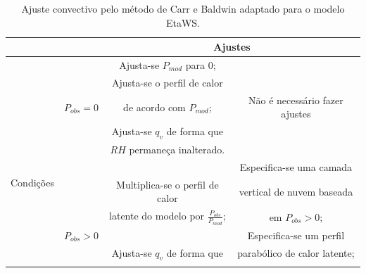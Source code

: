 \begin{table}[!hbp]
\caption{Ajuste convectivo pelo método de Carr e Baldwin adaptado para o \-mo\-de\-lo EtaWS.}
\label{tab02}
\centering
\begin{tabular}{|c|c|c|c|}
\cline{3-4} 
\multicolumn{1}{c}{} &  & \multicolumn{2}{c|}{Ajustes}\tabularnewline
\hline 
\begin{sideways}

\end{sideways} &  & Ajusta-se $P_{mod}$ para 0; & \tabularnewline
\begin{sideways}

\end{sideways} &  & Ajusta-se o perfil de calor & \tabularnewline
\begin{sideways}

\end{sideways} & $P_{obs}=0$ & de acordo com $P_{mod}$; & Não é necessário fazer ajustes\tabularnewline
\begin{sideways}

\end{sideways} &  & Ajusta-se $q_{v}$ de forma que & \tabularnewline
\begin{sideways}

\end{sideways} &  & $RH$ permaneça inalterado. & \tabularnewline
\cline{2-4} 
\multirow{2}{0pt}{\begin{sideways}Condições\end{sideways}}
\begin{sideways}

\end{sideways} &  &  & Especifica-se uma camada\tabularnewline
 
\begin{sideways}

\end{sideways} &  & Multiplica-se o perfil de calor & vertical de nuvem baseada\tabularnewline
\begin{sideways}

\end{sideways} &  & latente do modelo por $\frac{P_{obs}}{P_{mod}}$; & em $P_{obs}>0$;\tabularnewline
\begin{sideways}

\end{sideways} & $P_{obs}>0$&  & Especifica-se um perfil\tabularnewline
\begin{sideways}

\end{sideways} &  & Ajusta-se $q_{v}$ de forma que & parabólico de calor latente;\tabularnewline
\begin{sideways}


\end{sideways}
\end{tabular}
\end{table}
